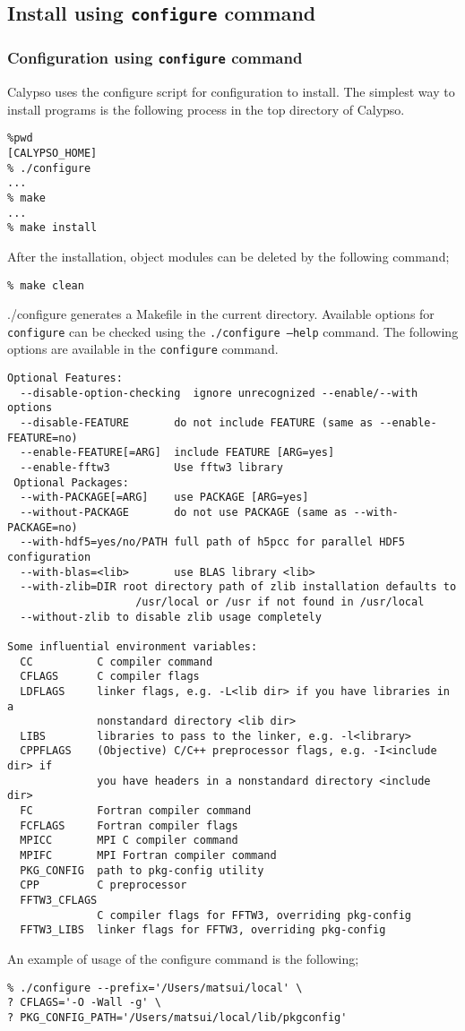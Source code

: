 \subsection{Install using {\tt configure} command }
\subsubsection{Configuration using {\tt configure} command }
Calypso uses the configure script for configuration to install. The simplest way to install programs is the following process in the top directory of Calypso.
% 
\begin{verbatim}
%pwd
[CALYPSO_HOME]
% ./configure
...
% make
...
% make install
\end{verbatim}
%
After the installation, object modules can be deleted by the following command;
% 
\begin{verbatim}
% make clean
\end{verbatim}
%

{./configure} generates a Makefile in the current directory.  Available options for {\tt configure} can be checked using the {\tt ./configure --help} command. The following options are available in the {\tt configure} command.
%
{\small
\begin{verbatim}
Optional Features:
  --disable-option-checking  ignore unrecognized --enable/--with options
  --disable-FEATURE       do not include FEATURE (same as --enable-FEATURE=no)
  --enable-FEATURE[=ARG]  include FEATURE [ARG=yes]
  --enable-fftw3          Use fftw3 library 
 Optional Packages:
  --with-PACKAGE[=ARG]    use PACKAGE [ARG=yes]
  --without-PACKAGE       do not use PACKAGE (same as --with-PACKAGE=no)
  --with-hdf5=yes/no/PATH full path of h5pcc for parallel HDF5 configuration
  --with-blas=<lib>       use BLAS library <lib>
  --with-zlib=DIR root directory path of zlib installation defaults to
                    /usr/local or /usr if not found in /usr/local
  --without-zlib to disable zlib usage completely

Some influential environment variables:
  CC          C compiler command
  CFLAGS      C compiler flags
  LDFLAGS     linker flags, e.g. -L<lib dir> if you have libraries in a
              nonstandard directory <lib dir>
  LIBS        libraries to pass to the linker, e.g. -l<library>
  CPPFLAGS    (Objective) C/C++ preprocessor flags, e.g. -I<include dir> if
              you have headers in a nonstandard directory <include dir>
  FC          Fortran compiler command
  FCFLAGS     Fortran compiler flags
  MPICC       MPI C compiler command
  MPIFC       MPI Fortran compiler command
  PKG_CONFIG  path to pkg-config utility
  CPP         C preprocessor
  FFTW3_CFLAGS
              C compiler flags for FFTW3, overriding pkg-config
  FFTW3_LIBS  linker flags for FFTW3, overriding pkg-config

\end{verbatim}
}
%
An example of usage of the configure command is the following;
\begin{verbatim}
% ./configure --prefix='/Users/matsui/local' \
? CFLAGS='-O -Wall -g' \
? PKG_CONFIG_PATH='/Users/matsui/local/lib/pkgconfig'
\end{verbatim}

